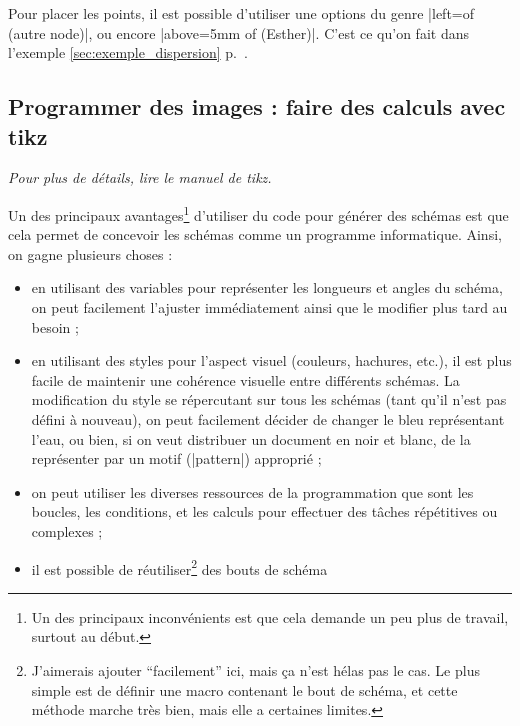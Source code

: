 \documentclass[a4paper]{ltxdoc}
\begin{document}
%
\begin{codeexample}[width=5cm]
\end{codeexample}
%

Pour placer les points, il est possible d'utiliser une options du genre |left=of (autre node)|, ou encore |above=5mm of (Esther)|. C'est ce qu'on fait dans l'exemple \ref{sec:exemple_dispersion} p.~\pageref{sec:exemple_dispersion}.

\subsection{Programmer des images : faire des calculs avec tikz}

\emph{Pour plus de détails, lire le manuel de tikz.}

Un des principaux avantages\footnote{Un des principaux inconvénients est que cela demande un peu plus de travail, surtout au début.} d'utiliser du code pour générer des schémas est que cela permet de concevoir les schémas comme un programme informatique. Ainsi, on gagne plusieurs choses :
\begin{itemize}
  \item en utilisant des variables pour représenter les longueurs et angles du schéma, on peut facilement l'ajuster immédiatement ainsi que le modifier plus tard au besoin ;
  \item en utilisant des styles pour l'aspect visuel (couleurs, hachures, etc.), il est plus facile de maintenir une cohérence visuelle entre différents schémas. La modification du style se répercutant sur tous les schémas (tant qu'il n'est pas défini à nouveau), on peut facilement décider de changer le bleu représentant l'eau, ou bien, si on veut distribuer un document en noir et blanc, de la représenter par un motif (|pattern|) approprié ;
  \item on peut utiliser les diverses ressources de la programmation que sont les boucles, les conditions, et les calculs pour effectuer des tâches répétitives ou complexes ;
  \item il est possible de réutiliser\footnote{J'aimerais ajouter \enquote{facilement} ici, mais ça n'est hélas pas le cas. Le plus simple est de définir une macro contenant le bout de schéma, et cette méthode marche très bien, mais elle a certaines limites.} des bouts de schéma
\end{itemize}
\end{document}
